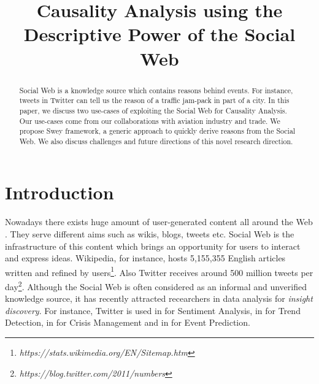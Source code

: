 \documentclass[conference]{IEEEtran}
\begin{document}
\title{Causality Analysis using the Descriptive Power of the Social Web}



\maketitle

\begin{abstract}
Social Web is a knowledge source which contains reasons behind events. For instance, tweets in Twitter can tell us the reason of a traffic jam-pack in part of a city. In this paper, we discuss two use-cases of exploiting the Social Web for Causality Analysis. Our use-cases come from our collaborations with aviation industry and trade. We propose {\sc Swey} framework, a generic approach to quickly derive reasons from the Social Web. We also discuss challenges and future directions of this novel research direction.
\end{abstract}

\IEEEpeerreviewmaketitle

\section{Introduction}
\label{sec:intro}
Nowadays there exists huge amount of user-generated content all around the Web \cite{moens2014mining}. They serve different aims such as wikis, blogs, tweets etc. Social Web is the infrastructure of this content which brings an opportunity for users to interact and express ideas. Wikipedia, for instance, hosts 5,155,355 English articles written and refined by users\footnote{\it https://stats.wikimedia.org/EN/Sitemap.htm}. Also Twitter receives around 500 million tweets per day\footnote{\it https://blog.twitter.com/2011/numbers}. Although the Social Web is often considered as an informal and unverified knowledge source, it has recently attracted recearchers in data analysis for {\em insight discovery}. For instance, Twitter is used in \cite{bruns2013towards} for Sentiment Analysis, in \cite{mathioudakis2010twittermonitor} for Trend Detection, in \cite{cameron2012emergency} for Crisis Management and in \cite{DBLP:conf/kdd/RitterMEC12} for Event Prediction.
\end{document}
